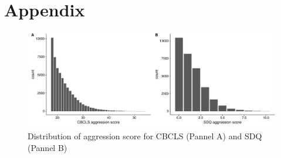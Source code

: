 \section{Appendix}
\label{sec:appendix_longhera}

\begin{figure}[htpb]
  \centering
  \includegraphics[width=0.7\linewidth]{longHera/figure/aggression_hist_score.pdf}
  \caption{Distribution of aggression score for CBCLS (Pannel A) and SDQ (Pannel B)}\label{fig:hist_aggression}
\end{figure}
